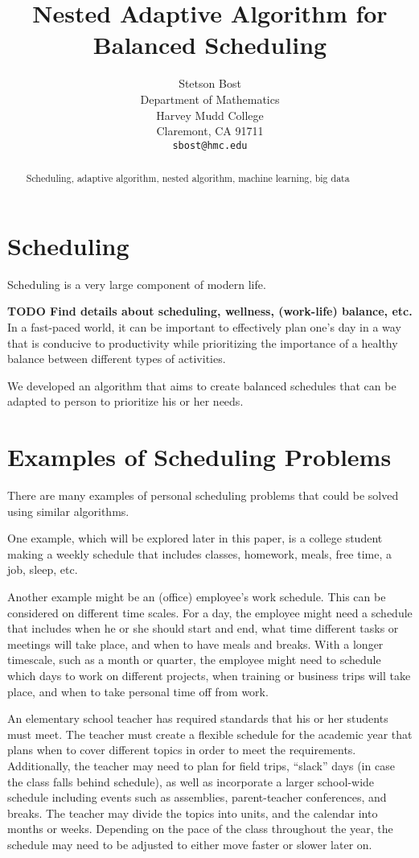 \documentclass{article}
\title{Nested Adaptive Algorithm for Balanced Scheduling}
\author{
  Stetson Bost\\
  Department of Mathematics\\
  Harvey Mudd College\\
  Claremont, CA 91711 \\
  \texttt{sbost@hmc.edu}\\
}
\newcommand{\todo}[1]{{\bf TODO #1}\\}
\begin{document}

\maketitle

\begin{abstract}
Scheduling, adaptive algorithm, nested algorithm, machine learning, big data
\end{abstract}

\section{Scheduling}
Scheduling is a very large component of modern life.

\todo{Find details about scheduling, wellness, (work-life) balance, etc.}

In a fast-paced world, it can be important to effectively plan one's day in a way that is conducive to productivity while prioritizing the importance of a healthy balance between different types of activities. 

We developed an algorithm that aims to create balanced schedules that can be adapted to person to prioritize his or her needs.

\newpage
\section{Examples of Scheduling Problems}
There are many examples of personal scheduling problems that could be solved using similar algorithms.

One example, which will be explored later in this paper, is a college student making a weekly schedule that includes classes, homework, meals, free time, a job, sleep, etc.

Another example might be an (office) employee's work schedule. This can be considered on different time scales. For a day, the employee might need a schedule that includes when he or she should start and end, what time different tasks or meetings will take place, and when to have meals and breaks. With a longer timescale, such as a month or quarter, the employee might need to schedule which days to work on different projects, when training or business trips will take place, and when to take personal time off from work.

An elementary school teacher has required standards that his or her students must meet. The teacher must create a flexible schedule for the academic year that plans when to cover different topics in order to meet the requirements. Additionally, the teacher may need to plan for field trips, ``slack'' days (in case the class falls behind schedule), as well as incorporate a larger school-wide schedule including events such as assemblies, parent-teacher conferences, and breaks. The teacher may divide the topics into units, and the calendar into months or weeks. Depending on the pace of the class throughout the year, the schedule may need to be adjusted to either move faster or slower later on.
\end{document}
